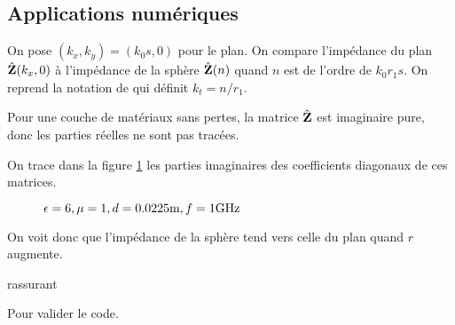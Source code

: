   \subsection{Applications numériques}
    On pose \((k_x,k_y) = (k_0 s, 0)\) pour le plan.
    On compare l'impédance du plan \(\hat{\mathbf{Z}}(k_x,0)\) à l'impédance de la sphère \(\hat{\mathbf{Z}}(n)\) quand \(n\) est de l'ordre de \(k_0r_1s\).
    On reprend la notation de \cite[p.~62]{hoppe_impedance_1995} qui définit \(k_t= n/r_1\).

    Pour une couche de matériaux sans pertes, la matrice \(\hat{\mathbf{Z}}\) est imaginaire pure, donc les parties réelles ne sont pas tracées.

    On trace dans la figure \ref{fig:imp_fourier:sphere:hoppe_p62:converge_rayon} les parties imaginaires des coefficients diagonaux de ces matrices.

    \begin{figure}[!hbt]
      \centering
      
      \caption{\(\epsilon = 6, \mu = 1, d=0.0225\text{m}, f=1\text{GHz}\)}
      \label{fig:imp_fourier:sphere:hoppe_p62:converge_rayon}
    \end{figure}
     On voit donc que l'impédance de la sphère tend vers celle du plan quand \(r\) augmente.
\begin{REM}
    rassurant
\end{REM}
\begin{REP}
    Pour valider le code.
\end{REP}
